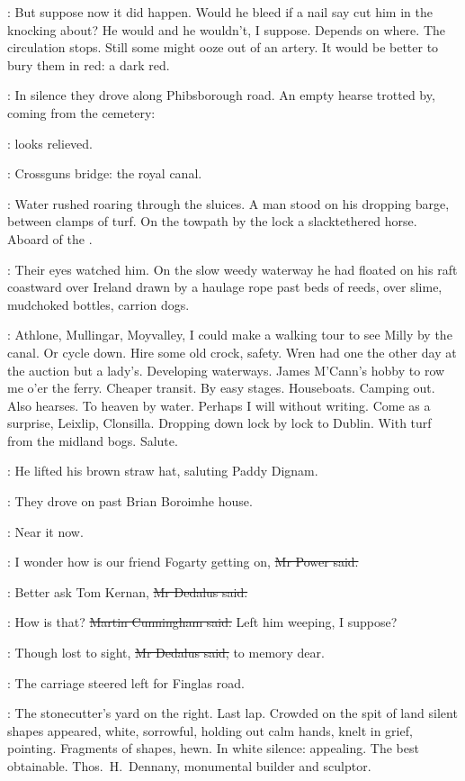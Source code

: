 \BloomInt:
But suppose now it did happen.
Would he bleed if a nail say cut him in the knocking about?
He would and he wouldn't, I suppose.
Depends on where.
The circulation stops.
Still some might ooze out of an artery.
It would be better to bury them in red:
a dark red.

:
In silence they drove along Phibsborough road.
An empty hearse trotted by, coming from the cemetery:

\BloomInt:
looks relieved.

:
Crossguns bridge:
the royal canal.

:
Water rushed roaring through the sluices.
A man stood on his
dropping barge, between clamps of turf.
On the towpath by the lock
a slacktethered horse.
Aboard of the .

:
Their eyes watched him.
On the slow weedy waterway
he had floated on his raft coastward over Ireland
drawn by a haulage rope
past beds of reeds,
over slime, mudchoked bottles, carrion dogs.

\BloomInt:
Athlone, Mullingar, Moyvalley,
I could make a walking tour to see Milly by the canal.
Or cycle down.
Hire some old crock, safety.
Wren had one the other day at the auction but a lady's.
Developing waterways.
James M'Cann's hobby to row me o'er the ferry.
Cheaper transit.
By easy stages.
Houseboats.
Camping out.
Also hearses.
To heaven by water.
Perhaps I will without writing.
Come as a surprise, Leixlip, Clonsilla.
Dropping down lock by lock to Dublin.
With turf from the midland bogs.
Salute.

:
He lifted his brown straw hat,
saluting Paddy Dignam.

:
They drove on past Brian Boroimhe house.

\BloomInt:
Near it now.

\power:
I wonder how is our friend Fogarty getting on,
\sout{Mr Power said.}

\simon:
Better ask Tom Kernan,
\sout{Mr Dedalus said.}

\cunningham:
How is that?
\sout{Martin Cunningham said.}
Left him weeping, I suppose?

\simon:
Though lost to sight,
\sout{Mr Dedalus said,}
to memory dear.

:
The carriage steered left for Finglas road.

\BloomInt:
The stonecutter's yard on the right.
Last lap.
Crowded on the spit of land
silent shapes appeared,
white, sorrowful, holding out calm hands,
knelt in grief, pointing.
Fragments of shapes, hewn.
In white silence:
appealing.
The best obtainable.
Thos.~H.~Dennany, monumental builder and sculptor.

